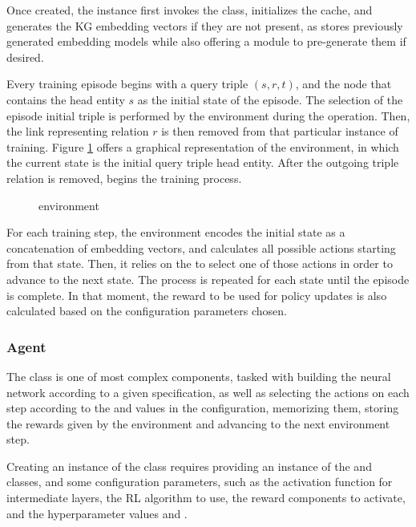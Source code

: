 Once created, the  instance first invokes the  class, initializes the cache, and generates the KG embedding vectors if they are not present, as \toolname{} stores previously generated embedding models while also offering a module to pre-generate them if desired. 

Every training episode begins with a query triple $(s,r,t)$, and the node that contains the head entity $s$ as the initial state of the episode. The selection of the episode initial triple is performed by the environment during the  operation. Then, the link representing relation $r$ is then removed from that particular instance of training. Figure \ref{fig:environment} offers a graphical representation of the environment, in which the current state is the initial query triple head entity. 
After the outgoing triple relation is removed, \toolname{} begins the training process. 


\begin{figure}[!h]
    \centering
    
    \caption{\toolname{} environment}
    \label{fig:environment}
\end{figure}

For each training step, the environment encodes the initial state as a concatenation of embedding vectors, and calculates all possible actions starting from that state. Then, it relies on the  to select one of those actions in order to advance to the next state. The process is repeated for each state until the episode is complete. In that moment, the reward to be used for policy updates is also calculated based on the configuration parameters chosen.

\subsubsection{Agent}
The  class is one of \toolname{} most complex components, tasked with building the neural network according to a given specification, as well as selecting the actions on each step according to the  and  values in the configuration, memorizing them, storing the rewards given by the environment and advancing to the next environment step.

Creating an instance of the  class requires providing an instance of the  and  classes, and some configuration parameters, such as the activation function for intermediate layers, the RL algorithm to use, the reward components to activate, and the hyperparameter values  and .

